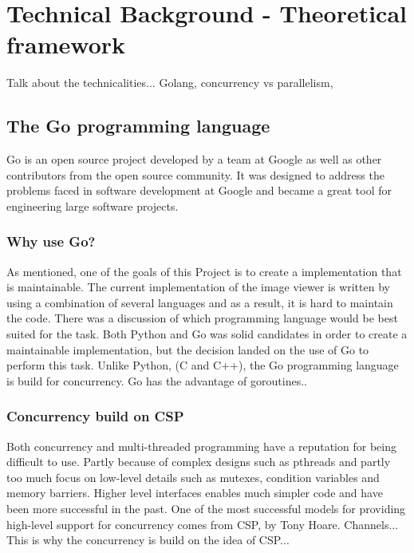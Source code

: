 \documentclass[12pt, a4paper, oneside]{article}
\begin{document}
\section{Technical Background - Theoretical framework}
Talk about the technicalities... Golang, concurrency vs parallelism,
\subsection{The Go programming language}
Go is an open source project developed by a team at Google as well as other contributors from the open source community. It was designed to address the problems faced in software development at Google and became a great tool for engineering large software projects.

\subsubsection{Why use Go?}
As mentioned, one of the goals of this Project is to create a implementation that is maintainable. The current implementation of the image viewer is written by using a combination of several languages and as a result, it is hard to maintain the code. 
There was a discussion of which programming language would be best suited for the task. Both Python and Go was solid candidates in order to create a maintainable implementation, but the decision landed on the use of Go to perform this task.
Unlike Python, (C and C++), the Go programming language is build for concurrency. 
Go has the advantage of goroutines..

\subsubsection{Concurrency build on CSP}
Both concurrency and multi-threaded programming have a reputation for being difficult to use. Partly because of complex designs such as pthreads and partly too much focus on low-level details such as mutexes, condition variables and memory barriers. Higher level interfaces enables much simpler code and have been more successful in the past. One of the most successful models for providing high-level support for concurrency comes from CSP, by Tony Hoare. 
Channels... 
This is why the concurrency is build on the idea of CSP...
\end{document}

